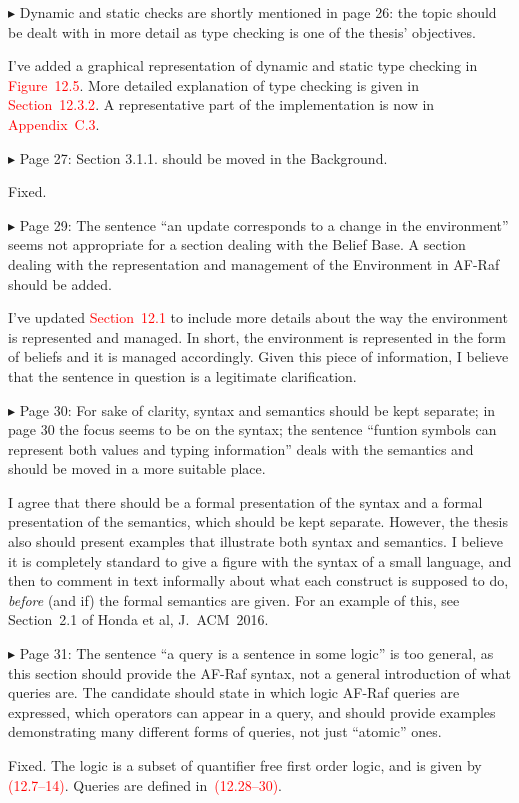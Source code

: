 \documentclass{article}
\newcommand*\R[1]{\textcolor{red}{#1}} %
\newenvironment{them}%
  {\bigskip\noindent\begingroup\color{blue}$\blacktriangleright$\enspace}%
  {\endgroup\par}
\begin{document}
\begin{them}
Dynamic and static checks are shortly mentioned in page 26: the topic should be
dealt with in more detail as type checking is one of the thesis' objectives.
\end{them}
I've added a graphical representation of dynamic and static type checking
in \R{Figure~12.5}. More detailed explanation of type checking is given
in \R{Section~12.3.2}. A representative part of the implementation is now
in \R{Appendix~C.3}.

\begin{them}
Page 27:
Section 3.1.1. should be moved in the Background.
\end{them}
Fixed. 

\begin{them}
Page 29:
The sentence ``an update corresponds to a change in the environment'' seems not
appropriate for a section dealing with the Belief Base. A section dealing with
the representation and management of the Environment in AF-Raf should be added.
\end{them}
I've updated \R{Section~12.1} to include more details about the way the
environment is represented and managed. In short, the environment is
represented in the form of beliefs and it is managed accordingly. Given this
piece of information, I believe that the sentence in question is a legitimate
clarification.

\begin{them}
Page 30:
For sake of clarity, syntax and semantics should be kept separate; in page 30
the focus seems to be on the syntax; the sentence ``funtion symbols can
represent both values and typing information'' deals with the semantics and
should be moved in a more suitable place.
\end{them}

I agree that there should be a formal presentation of the syntax
  and a formal presentation of the semantics,
  which should be kept separate.
However, the thesis also should present examples
  that illustrate both syntax and semantics.
I believe it is completely standard to give a figure
  with the syntax of a small language,
and then to comment in text informally about what each construct
  is supposed to do,
  \emph{before} (and if) the formal semantics are given.
For an example of this,
  see Section~2.1 of Honda et al, J.~ACM~2016.


\begin{them}
Page 31:
The sentence ``a query is a sentence in some logic'' is too general, as this
section should provide the AF-Raf syntax, not a general introduction of what
queries are. The candidate should state in which logic AF-Raf queries are
expressed, which operators can appear in a query, and should provide examples
demonstrating many different forms of queries, not just ``atomic'' ones.
\end{them}
Fixed.
The logic is a subset of quantifier free first order logic,
  and is given by \R{(12.7--14)}.
Queries are defined in~\R{(12.28--30)}.
\end{document}
